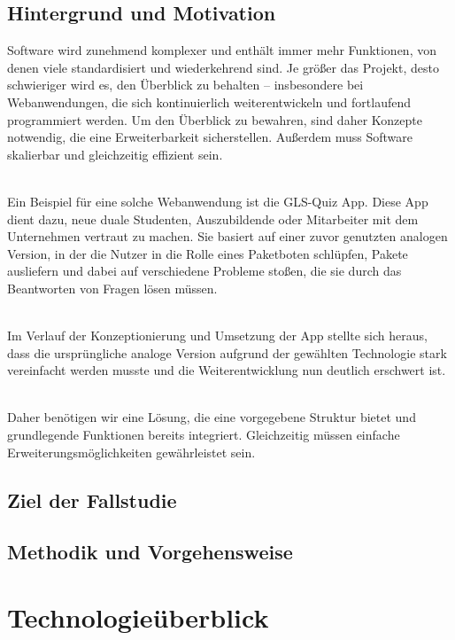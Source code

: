 \documentclass[biblatex]{lni}
\begin{document}
\subsection{Hintergrund und Motivation}
Software wird zunehmend komplexer und enthält immer mehr Funktionen, von denen viele standardisiert und wiederkehrend sind.
Je größer das Projekt, desto schwieriger wird es, den Überblick zu behalten – insbesondere bei Webanwendungen,
die sich kontinuierlich weiterentwickeln und fortlaufend programmiert werden.
Um den Überblick zu bewahren, sind daher Konzepte notwendig, die eine Erweiterbarkeit sicherstellen.
Außerdem muss Software skalierbar und gleichzeitig effizient sein.

\\

Ein Beispiel für eine solche Webanwendung ist die GLS-Quiz App.
Diese App dient dazu, neue duale Studenten, Auszubildende oder Mitarbeiter mit dem Unternehmen vertraut zu machen.
Sie basiert auf einer zuvor genutzten analogen Version, in der die Nutzer in die Rolle eines Paketboten schlüpfen,
Pakete ausliefern und dabei auf verschiedene Probleme stoßen, die sie durch das Beantworten von Fragen lösen müssen.

\\

Im Verlauf der Konzeptionierung und Umsetzung der App stellte sich heraus,
dass die ursprüngliche analoge Version aufgrund der gewählten Technologie stark vereinfacht werden musste
und die Weiterentwicklung nun deutlich erschwert ist.

\\

Daher benötigen wir eine Lösung,
die eine vorgegebene Struktur bietet und grundlegende Funktionen bereits integriert.
Gleichzeitig müssen einfache Erweiterungsmöglichkeiten gewährleistet sein.

\subsection{Ziel der Fallstudie}

\subsection{Methodik und Vorgehensweise}

\section{Technologieüberblick}
\end{document}
